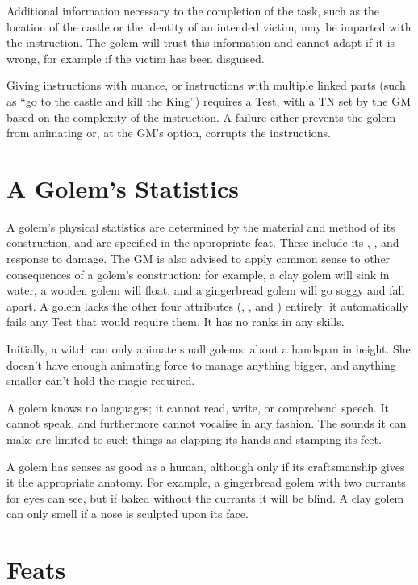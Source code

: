 Additional information necessary to the completion of the task, such as the location of the castle or the identity of an intended victim, may be imparted with the instruction.
The golem will trust this information and cannot adapt if it is wrong, for example if the victim has been disguised.

Giving instructions with nuance, or instructions with multiple linked parts (such as ``go to the castle and kill the King'') requires a Test, with a TN set by the GM based on the complexity of the instruction.
A failure either prevents the golem from animating or, at the GM's option, corrupts the instructions.

\section{A Golem's Statistics}

A golem's physical statistics are determined by the material and method of its construction, and are specified in the appropriate feat.
These include its , , and response to damage.
The GM is also advised to apply common sense to other consequences of a golem's construction: for example, a clay golem will sink in water, a wooden golem will float, and a gingerbread golem will go soggy and fall apart.
A golem lacks the other four attributes (, ,  and ) entirely; it automatically fails any Test that would require them.
It has no ranks in any skills.

Initially, a witch can only animate small golems: about a handspan in height.
She doesn't have enough animating force to manage anything bigger, and anything smaller can't hold the magic required.

A golem knows no languages; it cannot read, write, or comprehend speech.
It cannot speak, and furthermore cannot vocalise in any fashion.
The sounds it can make are limited to such things as clapping its hands and stamping its feet.

A golem has senses as good as a human, although only if its craftsmanship gives it the appropriate anatomy.
For example, a gingerbread golem with two currants for eyes can see, but if baked without the currants it will be blind.
A clay golem can only smell if a nose is sculpted upon its face.

\section{Feats}

